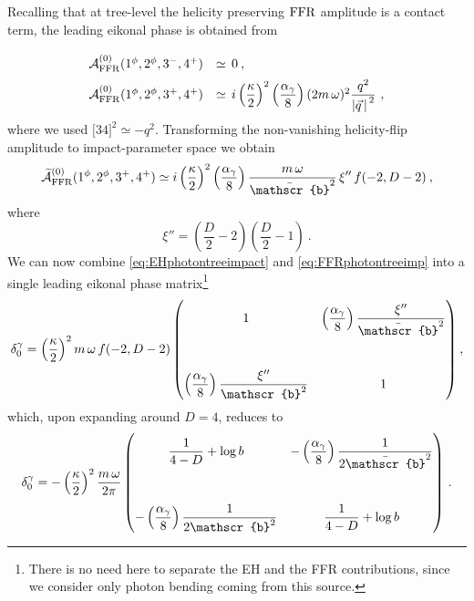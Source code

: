 \documentclass[a4paper,11pt]{article}
\numberwithin{equation}{section}
\newcommand{\sqr}[2]{\lbrack #1 #2 \rbrack}
\newcommand{\cA}{\mathcal{A}}
\def\cA{\mathcal{A}}
\begin{document}
Recalling that at tree-level the helicity preserving $\rm FFR$ amplitude is a contact term, the leading eikonal phase is obtained from
\begin{equation}
\def\arraystretch{2}
\begin{array}{rl}
\cA^{(0)}_{\rm FFR} (1^\phi, 2^\phi, 3^{-}, 4^{+}) &\simeq \, 0 \> , \\
\cA^{(0)}_{\rm FFR} (1^\phi, 2^\phi, 3^{+}, 4^{+}) &\simeq \, i \left(\dfrac{\kappa}{2}\right)^2 \left(\dfrac{\alpha_\gamma}{8}\right) (2m\,\omega)^2 \dfrac{q^2}{\left|\vec{q}\,\right|^{\, 2}}\ ,
\end{array}
\end{equation}
where we used $\sqr{3}{4}^2 \simeq - q^2$. Transforming the non-vanishing helicity-flip amplitude to impact-parameter space we obtain
\begin{equation}\label{eq:FFRphotontreeimp}
    \widetilde{\cA}^{(0)}_{\rm FFR} (1^\phi, 2^\phi, 3^{+}, 4^{+}) \simeq i \left(\frac{\kappa}{2}\right)^2 \left(\frac{\alpha_\gamma}{8}\right)\frac{m\,\omega}{\bar{\mathscr{b}}^2} \, \xi'' \, f(-2,D-2) \> ,
\end{equation}
where
\begin{equation}
\xi''=\left(\frac{D}{2}-2\right) \left(\frac{D}{2}-1\right) \> .
\end{equation}
We can now combine \eqref{eq:EHphotontreeimpact} and \eqref{eq:FFRphotontreeimp} into a single leading eikonal phase matrix\footnote{There is no need here to separate the EH and the FFR contributions, since we consider only photon bending coming from this source.}
\begin{equation}
\delta_0^{\gamma} = \left(\frac{\kappa}{2}\right)^2 m\,\omega \, f(-2,D-2) \, \mqty( 1 & \left(\dfrac{\alpha_\gamma}{8}\right) \dfrac{\xi''}{\bar{\mathscr{b}}^2} \\ \cr \left(\dfrac{\alpha_\gamma}{8}\right)  \dfrac{\xi''}{ \mathscr{b}^2} & 1) \> ,
\end{equation}
which, upon expanding around $D=4$, reduces to
\begin{equation}
    \delta_0^{\gamma} = - \left(\frac{\kappa}{2}\right)^2 \frac{m\,\omega}{2\pi} \, \mqty( \dfrac{1}{4-D} + \log{b} & -\left(\dfrac{\alpha_\gamma}{8}\right) \dfrac{1}{2 \bar{\mathscr{b}}^2} \\ \cr -\left(\dfrac{\alpha_\gamma}{8}\right) \dfrac{1}{2 \mathscr{b}^2} & \dfrac{1}{4-D} + \log{b})\ .
\end{equation}
\end{document}
